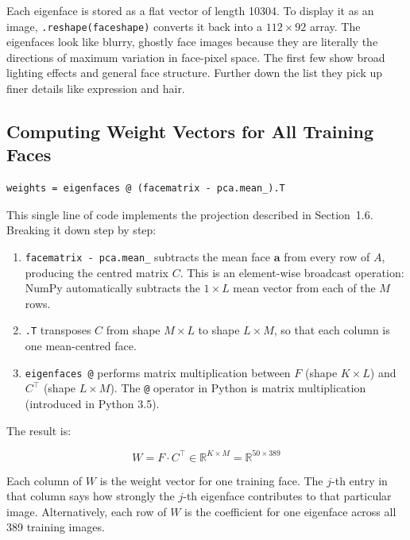 \documentclass[12pt,a4paper]{article}
\begin{document}
Each eigenface is stored as a flat vector of length 10304. To display it as
an image, \texttt{.reshape(faceshape)} converts it back into a $112 \times 92$
array. The eigenfaces look like blurry, ghostly face images because they are
literally the directions of maximum variation in face-pixel space. The first
few show broad lighting effects and general face structure. Further down the
list they pick up finer details like expression and hair.

\subsection{Computing Weight Vectors for All Training Faces}

\vspace{0.5em}
\begin{minipage}{\linewidth}
\begin{lstlisting}[caption={Projecting each training face onto the eigenface space}]
weights = eigenfaces @ (facematrix - pca.mean_).T
\end{lstlisting}
\end{minipage}

This single line of code implements the projection described in Section~1.6.
Breaking it down step by step:
\newpage
\begin{enumerate}
  \item \texttt{facematrix - pca.mean\_} subtracts the mean face $\mathbf{a}$
        from every row of $A$, producing the centred matrix $C$. This is an
        element-wise broadcast operation: NumPy automatically subtracts the
        $1 \times L$ mean vector from each of the $M$ rows.

  \item \texttt{.T} transposes $C$ from shape $M \times L$ to shape
        $L \times M$, so that each column is one mean-centred face.

  \item \texttt{eigenfaces @} performs matrix multiplication between $F$
        (shape $K \times L$) and $C^{\top}$ (shape $L \times M$). The
        \texttt{@} operator in Python is matrix multiplication (introduced in
        Python 3.5).
\end{enumerate}

The result is:

\[
W = F \cdot C^{\top} \in \mathbb{R}^{K \times M} = \mathbb{R}^{50 \times 389}
\]

Each column of $W$ is the weight vector for one training face. The $j$-th
entry in that column says how strongly the $j$-th eigenface contributes to
that particular image. Alternatively, each row of $W$ is the coefficient for
one eigenface across all 389 training images.
\end{document}
